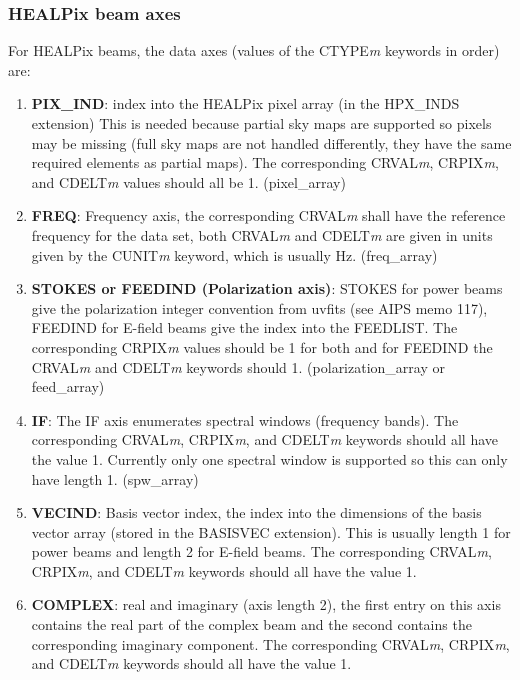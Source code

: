 \documentclass[11pt, oneside]{article}   	%
\begin{document}
\subsubsection{HEALPix beam axes}
For HEALPix beams, the data axes (values of the CTYPE\textit{m} keywords in order) are: 
\begin{enumerate}
\item{\textbf{PIX\_IND}: index into the HEALPix pixel array (in the HPX\_INDS extension) This is needed because partial sky maps are supported so pixels may be missing (full sky maps are not handled differently, they have the same required elements as partial maps). The corresponding CRVAL\textit{m}, CRPIX\textit{m}, and CDELT\textit{m} values should all be 1. (pixel\_array)}
\item{\textbf{FREQ}: Frequency axis, the corresponding CRVAL\textit{m} shall have the reference frequency for the data set, both CRVAL\textit{m} and CDELT\textit{m} are given in units given by the CUNIT\textit{m} keyword, which is usually Hz. (freq\_array)}
\item{\textbf{STOKES or FEEDIND (Polarization axis)}: STOKES for power beams give the polarization integer convention from uvfits (see AIPS memo 117), FEEDIND for E-field beams give the index into the FEEDLIST. The corresponding CRPIX\textit{m} values should be 1 for both and for FEEDIND the CRVAL\textit{m} and CDELT\textit{m} keywords should 1. (polarization\_array or feed\_array)}
\item{\textbf{IF}: The IF axis enumerates spectral windows (frequency bands). The corresponding CRVAL\textit{m}, CRPIX\textit{m}, and CDELT\textit{m} keywords should all have the value 1. Currently only one spectral window is supported so this can only have length 1. (spw\_array)}
\item{\textbf{VECIND}: Basis vector index, the index into the dimensions of the basis vector array (stored in the BASISVEC extension). This is usually length 1 for power beams and length 2 for E-field beams. The corresponding CRVAL\textit{m}, CRPIX\textit{m}, and CDELT\textit{m} keywords should all have the value 1.}
\item{\textbf{COMPLEX}: real and imaginary (axis length 2), the first entry on this axis contains the real part of the complex beam and the second contains the corresponding imaginary component. The corresponding CRVAL\textit{m}, CRPIX\textit{m}, and CDELT\textit{m} keywords should all have the value 1.}
\end{enumerate}
\end{document}
